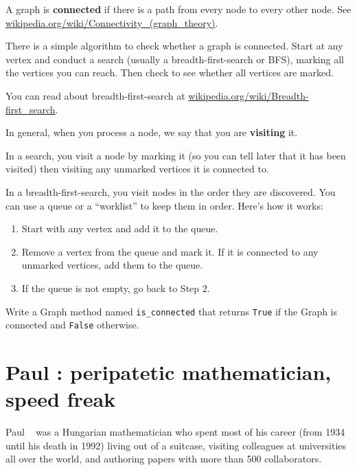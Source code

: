 \documentclass[10pt]{book}
\begin{document}
A graph is {\bf connected} if there is a path from every node to every
other node.  See \url{wikipedia.org/wiki/Connectivity_(graph_theory)}.

There is a simple algorithm to check whether a graph is connected.
Start at any vertex and conduct a search
(usually a breadth-first-search or BFS), marking all the vertices you
can reach.  Then check to see whether all vertices are marked.

You can read about breadth-first-search at
\url{wikipedia.org/wiki/Breadth-first_search}.  

In general, when you process
a node, we say that you are 
{\bf visiting} it.

In a search, you visit a node
by marking it (so you can tell later that it has been visited)
then visiting any
unmarked vertices it is connected to.

In a breadth-first-search, you visit nodes in the order they are
discovered.  You can use a queue or a ``worklist'' to keep them in
order.  Here's how it works:

\begin{enumerate}

\item Start with any vertex and add it to the queue.

\item Remove a vertex from the queue and mark it.  If it is
connected to any unmarked vertices, add them to the queue.

\item If the queue is not empty, go back to Step 2.

\end{enumerate}

\begin{ex}

Write a Graph method named \verb"is_connected" that returns
{\tt True} if the Graph is connected and {\tt False} otherwise.

\end{ex}


\section{Paul \Erdos: peripatetic mathematician, speed freak}

Paul \Erdos~ was a Hungarian mathematician who spent most
of his career (from 1934 until his death in 1992) living out
of a suitcase, visiting colleagues at universities all over the
world, and authoring papers with more than 500 collaborators.
\end{document}
